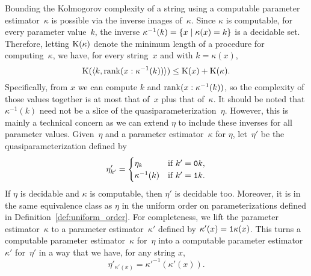 Bounding the Kolmogorov complexity of a string using a computable parameter estimator~$\kappa$ is possible via the inverse images of~$\kappa$.
Since $\kappa$ is computable, for every parameter value~$k$, the inverse $\kappa^{-1}(k) = \{x \;|\; \kappa(x) = k\}$ is a decidable set.
Therefore, letting $\operatorname{K}(\kappa)$ denote the minimum length of a procedure for computing~$\kappa$, we have, for every string~$x$ and with $k = \kappa(x)$,
\begin{equation}
\label{eq:kclowerbound}
  \operatorname{K}({\langle k, \operatorname{rank}(x : \kappa^{-1}(k))\rangle}) \le \operatorname{K}(x) + \operatorname{K}(\kappa).
\end{equation}
Specifically, from $x$ we can compute $k$ and $\operatorname{rank}(x : \kappa^{-1}(k))$, so the complexity of those values together is at most that of~$x$ plus that of~$\kappa$.
It should be noted that $\kappa^{-1}(k)$ need not be a slice of the quasiparameterization~$\eta$.
However, this is mainly a technical concern as we can extend $\eta$ to include these inverses for all parameter values.
Given~$\eta$ and a parameter estimator~$\kappa$ for $\eta$, let~$\eta'$ be the quasiparameterization defined by
\begin{equation*}
  \eta'_{k'} = \begin{cases}
    \eta_k	&\text{if $k' = \textnormal{\texttt{0}}k$}, \\
    \kappa^{-1}(k)	&\text{if $k' = \textnormal{\texttt{1}}k$}.
  \end{cases}
\end{equation*}
If $\eta$ is decidable and $\kappa$ is computable, then $\eta'$ is decidable too.
Moreover, it is in the same equivalence class as $\eta$ in the uniform order on parameterizations defined in Definition~\ref{def:uniform_order}.
For completeness, we lift the parameter estimator~$\kappa$ to a parameter estimator~$\kappa'$ defined by $\kappa'(x) = \textnormal{\texttt{1}}\kappa(x)$.
This turns a computable parameter estimator~$\kappa$ for~$\eta$ into a computable parameter estimator~$\kappa'$ for~$\eta'$ in a way that we have, for any string $x$,
\begin{equation*}
  \eta'_{\kappa'(x)} = \kappa'^{-1}(\kappa'(x)).
\end{equation*}

